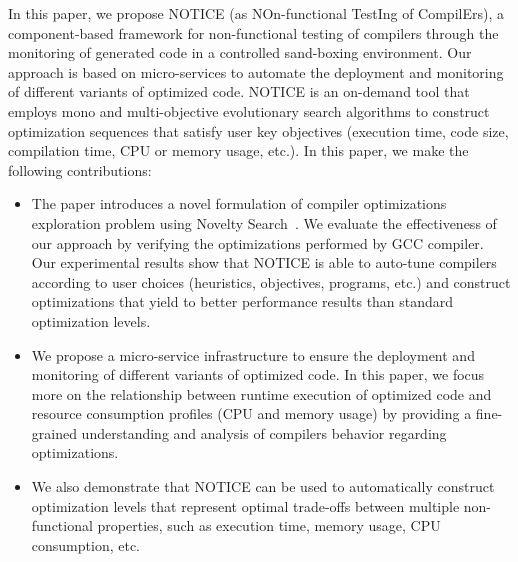 In this paper, we propose NOTICE (as NOn-functional TestIng of CompilErs), a component-based framework for non-functional testing of compilers through the monitoring of generated code in a controlled sand-boxing environment. Our approach is based on micro-services to automate the deployment and monitoring of different variants of optimized code. NOTICE is an on-demand tool that employs mono and multi-objective evolutionary search algorithms to construct optimization sequences that satisfy user key objectives (execution time, code size, compilation time, CPU or memory usage, etc.).
In this paper, we make the following contributions:
\begin{itemize}  
	
	
	
	\item The paper introduces a novel formulation of compiler optimizations exploration problem using Novelty Search~\cite{lehman2008exploiting}. We evaluate the effectiveness of our approach by verifying the optimizations performed by GCC compiler.
	Our experimental results show that NOTICE is able to auto-tune compilers according to user choices (heuristics, objectives, programs, etc.) and construct optimizations that yield to better performance results than standard optimization levels.
	
	\item We propose a micro-service infrastructure to ensure the deployment and monitoring of different variants of optimized code. In this paper, we focus more on the relationship between runtime execution of optimized code and resource consumption profiles (CPU and memory usage) by providing a fine-grained understanding and analysis of compilers behavior regarding optimizations.
	

	\item We also demonstrate that NOTICE can be used to automatically construct optimization levels that represent optimal trade-offs between multiple non-functional properties, such as execution time, memory usage, CPU consumption, etc.
\end{itemize}


 



